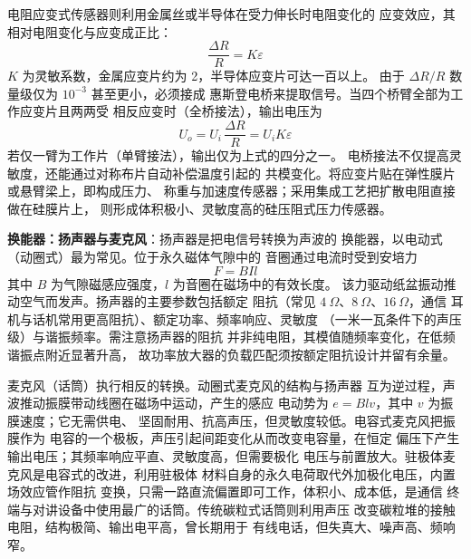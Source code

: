 电阻应变式传感器则利用金属丝或半导体在受力伸长时电阻变化的
应变效应，其相对电阻变化与应变成正比：
\[
\frac{\Delta R}{R} = K\varepsilon
\]
$K$ 为灵敏系数，金属应变片约为 2，半导体应变片可达一百以上。
由于 $\Delta R/R$ 数量级仅为 $10^{-3}$ 甚至更小，必须接成
惠斯登电桥来提取信号。当四个桥臂全部为工作应变片且两两受
相反应变时（全桥接法），输出电压为
\begin{equation}
U_o = U_i\,\frac{\Delta R}{R} = U_i K \varepsilon
\end{equation}
若仅一臂为工作片（单臂接法），输出仅为上式的四分之一。
电桥接法不仅提高灵敏度，还能通过对称布片自动补偿温度引起的
共模变化。将应变片贴在弹性膜片或悬臂梁上，即构成压力、
称重与加速度传感器；采用集成工艺把扩散电阻直接做在硅膜片上，
则形成体积极小、灵敏度高的硅压阻式压力传感器。

\textbf{换能器：扬声器与麦克风}：扬声器是把电信号转换为声波的
换能器，以电动式（动圈式）最为常见。位于永久磁体气隙中的
音圈通过电流时受到安培力
\[
F = B I l
\]
其中 $B$ 为气隙磁感应强度，$l$ 为音圈在磁场中的有效长度。
该力驱动纸盆振动推动空气而发声。扬声器的主要参数包括额定
阻抗（常见 $4\ \Omega$、$8\ \Omega$、$16\ \Omega$，通信
耳机与话机常用更高阻抗）、额定功率、频率响应、灵敏度
（一米一瓦条件下的声压级）与谐振频率。需注意扬声器的阻抗
并非纯电阻，其模值随频率变化，在低频谐振点附近显著升高，
故功率放大器的负载匹配须按额定阻抗设计并留有余量。

麦克风（话筒）执行相反的转换。动圈式麦克风的结构与扬声器
互为逆过程，声波推动振膜带动线圈在磁场中运动，产生的感应
电动势为 $e = Blv$，其中 $v$ 为振膜速度；它无需供电、
坚固耐用、抗高声压，但灵敏度较低。电容式麦克风把振膜作为
电容的一个极板，声压引起间距变化从而改变电容量，在恒定
偏压下产生输出电压；其频率响应平直、灵敏度高，但需要极化
电压与前置放大。驻极体麦克风是电容式的改进，利用驻极体
材料自身的永久电荷取代外加极化电压，内置场效应管作阻抗
变换，只需一路直流偏置即可工作，体积小、成本低，是通信
终端与对讲设备中使用最广的话筒。传统碳粒式话筒则利用声压
改变碳粒堆的接触电阻，结构极简、输出电平高，曾长期用于
有线电话，但失真大、噪声高、频响窄。

